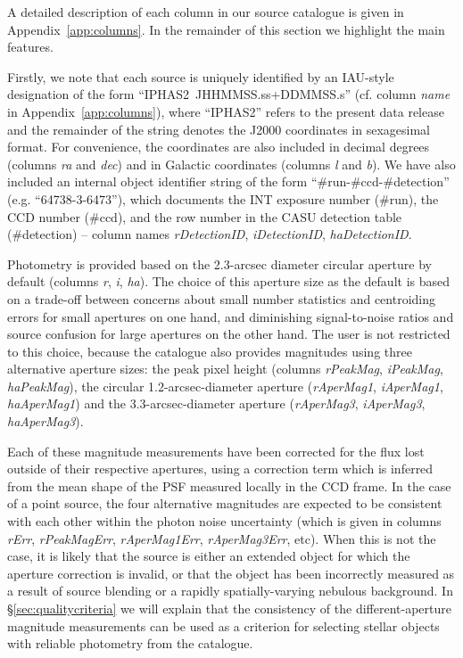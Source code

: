 \documentclass[useAMS,usenatbib]{mn2e}
\begin{document}
A detailed description of each column in our source catalogue
is given in Appendix~\ref{app:columns}.
In the remainder of this section we highlight the main features.

Firstly, we note that each source is uniquely identified by an
IAU-style designation of the form ``IPHAS2\ JHHMMSS.ss+DDMMSS.s''
(cf. column \emph{name} in Appendix~\ref{app:columns}),
where ``IPHAS2'' refers to the present
data release and the remainder of the string
denotes the J2000 coordinates in sexagesimal format.
For convenience, the coordinates
are also included in decimal degrees
(columns \emph{ra} and \emph{dec})
and in Galactic coordinates
(columns \emph{l} and \emph{b}).
We have also included an internal object identifier string 
of the form ``\#run-\#ccd-\#detection''
(e.g. ``64738-3-6473''),
which documents the INT exposure number (\#run),
the CCD number (\#ccd),
and the row number in the CASU detection table (\#detection)
-- column names \emph{rDetectionID},
\emph{iDetectionID}, \emph{haDetectionID}.

Photometry is provided based on the 2.3-arcsec diameter circular aperture
by default (columns \emph{r}, \emph{i}, \emph{ha}).
The choice of this aperture size as the default 
is based on a trade-off between concerns 
about small number statistics and centroiding errors
for small apertures on one hand,
and diminishing signal-to-noise ratios and source confusion
for large apertures on the other hand.
The user is not restricted to this choice, because
the catalogue also provides magnitudes
using three alternative aperture sizes:
the peak pixel height 
(columns \emph{rPeakMag}, \emph{iPeakMag}, \emph{haPeakMag}),
the circular 1.2-arcsec-diameter aperture 
(\emph{rAperMag1}, \emph{iAperMag1},
 \emph{haAperMag1}) and
the 3.3-arcsec-diameter aperture 
(\emph{rAperMag3}, \emph{iAperMag3},
 \emph{haAperMag3}).

Each of these magnitude measurements have been
corrected for the flux lost outside of their respective apertures,
using a correction term which is inferred from the
mean shape of the PSF measured locally in the CCD frame.
In the case of a point source,
the four alternative magnitudes are expected
to be consistent with each other
within the photon noise uncertainty
(which is given in columns \emph{rErr}, \emph{rPeakMagErr},
\emph{rAperMag1Err}, \emph{rAperMag3Err}, etc).
When this is not the case,
it is likely that the source is either
an extended object for which the aperture correction is invalid,
or that the object has been incorrectly measured as a result of
source blending or a rapidly spatially-varying nebulous background.
In \S\ref{sec:qualitycriteria} we will explain that the consistency
of the different-aperture magnitude measurements
can be used as a criterion for selecting stellar objects
with reliable photometry from the catalogue.
\end{document}

